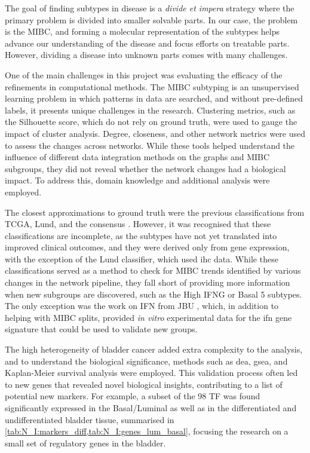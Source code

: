 The goal of finding subtypes in disease is a \textit{divide et impera} strategy where the primary problem is divided into smaller solvable parts. In our case, the problem is the MIBC, and forming a molecular representation of the subtypes helps advance our understanding of the disease and focus efforts on treatable parts. However, dividing a disease into unknown parts comes with many challenges. 

One of the main challenges in this project was evaluating the efficacy of the refinements in computational methods. The MIBC subtyping is an unsupervised learning problem in which patterns in data are searched, and without pre-defined labels, it presents unique challenges in the research. Clustering metrics, such as the Silhouette score, which do not rely on ground truth, were used to gauge the impact of cluster analysis. Degree, closeness, and other network metrics were used to assess the changes across networks. While these tools helped understand the influence of different data integration methods on the graphs and MIBC subgroups, they did not reveal whether the network changes had a biological impact. To address this, domain knowledge and additional analysis were employed.

The closest approximations to ground truth were the previous classifications from TCGA, Lund, and the consensus \citep{Robertson2017-mg, Marzouka2018-ge, Kamoun2020-tj}. However, it was recognised that these classifications are incomplete, as the subtypes have not yet translated into improved clinical outcomes, and they were derived only from gene expression, with the exception of the Lund classifier, which used \acrlong{ihc} data. While these classifications served as a method to check for MIBC trends identified by various changes in the network pipeline, they fall short of providing more information when new subgroups are discovered, such as the High IFNG or Basal 5 subtypes. The only exception was the work on \gls{IFN} from JBU \citep{Baker2022-bj}, which, in addition to helping with MIBC splits, provided \textit{in vitro} experimental data for the \acrshort{ifn} gene signature that could be used to validate new groups.

The high heterogeneity of bladder cancer added extra complexity to the analysis, and to understand the biological significance, methods such as \acrlong{dea}, \acrlong{gsea}, and Kaplan-Meier survival analysis were employed. This validation process often led to new genes that revealed novel biological insights, contributing to a list of potential new markers. For example, a subset of the 98 TF was found significantly expressed in the Basal/Luminal as well as in the differentiated and undifferentiated bladder tissue, summarised in \cref{tab:N_I:markers_diff,tab:N_I:genes_lum_basal}, focusing the research on a small set of regulatory genes in the bladder.


